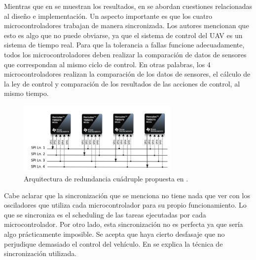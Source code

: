 Mientras que en \cite{hiergeist2018implementation} se muestran los resultados, en \cite{hiergeist2017internal} se abordan cuestiones relacionadas al diseño e implementación. Un aspecto importante es que los cuatro microcontroladores trabajan de manera sincronizada. Los autores mencionan que esto es algo que no puede obviarse, ya que el sistema de control del UAV es un sistema de tiempo real. Para que la tolerancia a fallas funcione adecuadamente, todos los microcontroladores deben realizar la comparación de datos de sensores que correspondan al mismo ciclo de control. En otras palabras, los 4 microcontroladores realizan la comparación de los datos de sensores, el cálculo de la ley de control y comparación de los resultados de las acciones de control, al mismo tiempo. %

\begin{figure}[H]
    \centering
    \includegraphics[width=0.7\textwidth]{img/redundancy_SPI.png}
    \caption{Arquitectura de redundancia cuádruple propuesta en \cite{hiergeist2018implementation}.}
    \label{fig:redundancy_SPI}
\end{figure}


Cabe aclarar que la sincronización que se menciona no tiene nada que ver con los osciladores que utiliza cada microcontrolador para su propio funcionamiento. Lo que se sincroniza es el scheduling de las tareas ejecutadas por cada microcontrolador. Por otro lado, esta sincronización no es perfecta ya que sería algo prácticamente imposible. Se acepta que haya cierto desfasaje que no perjudique demasiado el control del vehículo. En \cite{hiergeist2018implementation} se explica la técnica de sincronización utilizada.


